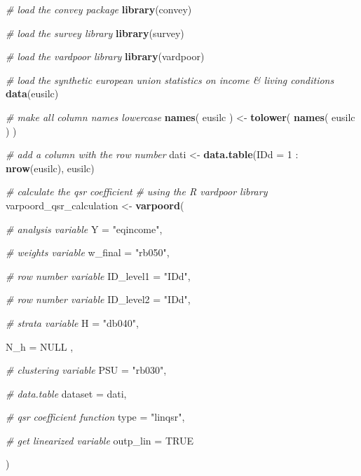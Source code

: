\documentclass[]{book}
\newenvironment{Shaded}{\begin{snugshade}}{\end{snugshade}}
\newcommand{\KeywordTok}[1]{\textcolor[rgb]{0.13,0.29,0.53}{\textbf{{#1}}}}
\newcommand{\DataTypeTok}[1]{\textcolor[rgb]{0.13,0.29,0.53}{{#1}}}
\newcommand{\DecValTok}[1]{\textcolor[rgb]{0.00,0.00,0.81}{{#1}}}
\newcommand{\StringTok}[1]{\textcolor[rgb]{0.31,0.60,0.02}{{#1}}}
\newcommand{\CommentTok}[1]{\textcolor[rgb]{0.56,0.35,0.01}{\textit{{#1}}}}
\newcommand{\OtherTok}[1]{\textcolor[rgb]{0.56,0.35,0.01}{{#1}}}
\newcommand{\NormalTok}[1]{{#1}}
\theoremstyle{definition}
\theoremstyle{definition}
\theoremstyle{remark}
\begin{document}
\begin{Shaded}
\begin{Highlighting}[]
\CommentTok{# load the convey package}
\KeywordTok{library}\NormalTok{(convey)}

\CommentTok{# load the survey library}
\KeywordTok{library}\NormalTok{(survey)}

\CommentTok{# load the vardpoor library}
\KeywordTok{library}\NormalTok{(vardpoor)}

\CommentTok{# load the synthetic european union statistics on income & living conditions}
\KeywordTok{data}\NormalTok{(eusilc)}

\CommentTok{# make all column names lowercase}
\KeywordTok{names}\NormalTok{( eusilc ) <-}\StringTok{ }\KeywordTok{tolower}\NormalTok{( }\KeywordTok{names}\NormalTok{( eusilc ) )}

\CommentTok{# add a column with the row number}
\NormalTok{dati <-}\StringTok{ }\KeywordTok{data.table}\NormalTok{(}\DataTypeTok{IDd =} \DecValTok{1} \NormalTok{:}\StringTok{ }\KeywordTok{nrow}\NormalTok{(eusilc), eusilc)}

\CommentTok{# calculate the qsr coefficient}
\CommentTok{# using the R vardpoor library}
\NormalTok{varpoord_qsr_calculation <-}
\StringTok{    }\KeywordTok{varpoord}\NormalTok{(}
    
        \CommentTok{# analysis variable}
        \DataTypeTok{Y =} \StringTok{"eqincome"}\NormalTok{, }
        
        \CommentTok{# weights variable}
        \DataTypeTok{w_final =} \StringTok{"rb050"}\NormalTok{,}
        
        \CommentTok{# row number variable}
        \DataTypeTok{ID_level1 =} \StringTok{"IDd"}\NormalTok{,}
        
        \CommentTok{# row number variable}
        \DataTypeTok{ID_level2 =} \StringTok{"IDd"}\NormalTok{,}
        
        \CommentTok{# strata variable}
        \DataTypeTok{H =} \StringTok{"db040"}\NormalTok{, }
        
        \DataTypeTok{N_h =} \OtherTok{NULL} \NormalTok{,}
        
        \CommentTok{# clustering variable}
        \DataTypeTok{PSU =} \StringTok{"rb030"}\NormalTok{, }
        
        \CommentTok{# data.table}
        \DataTypeTok{dataset =} \NormalTok{dati, }
        
        \CommentTok{# qsr coefficient function}
        \DataTypeTok{type =} \StringTok{"linqsr"}\NormalTok{,}
      
      \CommentTok{# get linearized variable}
      \DataTypeTok{outp_lin =} \OtherTok{TRUE}
        
    \NormalTok{)}
\end{Highlighting}
\end{Shaded}
\end{document}
